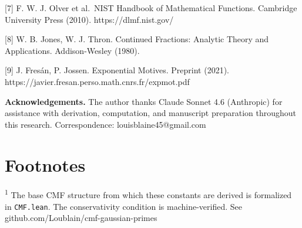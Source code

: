 \documentclass[11pt]{article}
\begin{document}
{[}7{]} F. W. J. Olver et al.~NIST Handbook of Mathematical Functions.
Cambridge University Press (2010). https://dlmf.nist.gov/

{[}8{]} W. B. Jones, W. J. Thron. Continued Fractions: Analytic Theory
and Applications. Addison-Wesley (1980).

{[}9{]} J. Fresán, P. Jossen. Exponential Motives. Preprint (2021).
https://javier.fresan.perso.math.cnrs.fr/expmot.pdf

\textbf{Acknowledgements.} The author thanks Claude Sonnet 4.6
(Anthropic) for assistance with derivation, computation, and manuscript
preparation throughout this research. Correspondence:
louisblaine45@gmail.com

\hypertarget{footnotes}{%
\section{Footnotes}\label{footnotes}}

\textsuperscript{1} The base CMF structure from which these constants
are derived is formalized in \texttt{CMF.lean}. The conservativity
condition is machine-verified. See
github.com/Loublain/cmf-gaussian-primes
\end{document}
